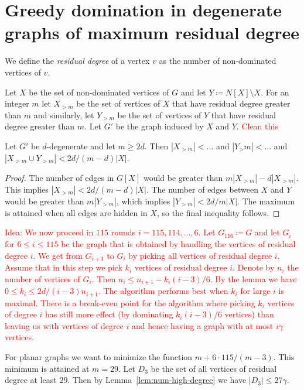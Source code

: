 \documentclass[a4paper,UKenglish,cleveref, autoref, thm-restate]{lipics-v2021}
\begin{document}
\section{Greedy domination in degenerate graphs of maximum 
residual degree}

We define the \emph{residual degree} of a vertex $v$ as the number 
of non-dominated vertices of $v$. 

Let $X$ be the set of non-dominated vertices of $G$ and let $Y\coloneqq
N[X]\setminus X$. For an integer $m$ let $X_{>m}$ be the set of 
vertices of $X$ that have residual degree greater than $m$ and 
similarly, let $Y_{>m}$ be the set of vertices of $Y$ that have residual degree greater than $m$. Let $G'$ be the graph induced by $X$ and $Y$. 
\textcolor{red}{Clean this}

\begin{lemma}\label{lem:num-high-degree}
Let $G'$ be $d$-degenerate and let $m\geq 2d$. Then $|X_{>m}|< ... $
and $|Y_>m|< ...$ and $|X_{>m}\cup Y_{>m}|<2d/(m-d)|X|$.
\end{lemma}
\begin{proof}
The number of edges in $G[X]$ would be greater than $m|X_{>m}|-d|X_{>m}|$. 
This implies $|X_{>m}|<2d/(m-d)|X|$. The number of edges between 
$X$ and $Y$ would be greater than $m|Y_{>m}|$, which implies 
$|Y_{>m}|<2d/m|X|$. The maximum is attained when all edges are hidden
in $X$, so the final inequality follows. 
\end{proof}

\textcolor{red}{Idea: 
We now proceed in $115$ rounds $i=115,114,\ldots, 6$. Let $G_{116}\coloneqq
G$ and let $G_i$ for $6\leq i\leq 115$ be the graph that is obtained
by handling the vertices of residual degree $i$. We get from $G_{i+1}$ to
$G_i$ by picking all vertices of residual degree $i$. Assume that in 
this step we pick $k_i$ vertices of residual degree $i$. Denote by $n_i$
the number of vertices of $G_i$. Then $n_i\leq n_{i+1}-k_i(i-3)/6$. By the 
lemma we have $0\leq k_i\leq 2d/(i-3)n_{i+1}$. The algorithm performs
best when $k_i$ for large $i$ is maximal. 
There is a break-even point for the algorithm where picking $k_i$ 
vertices of degree $i$ has still more effect (by dominating $k_i(i-3)/6$
vertices) than leaving us with vertices of degree $i$ and hence
having a graph with at most $i\gamma$ vertices. }



For planar graphs we want to minimize the function 
$m+6\cdot 115/(m-3)$. This minimum is attained at $m=29$. 
Let $D_3$ be the set of all vertices of residual degree at least $29$. 
Then by Lemma~\ref{lem:num-high-degree} we have $|D_3|\leq 27\gamma$. 
\end{document}
